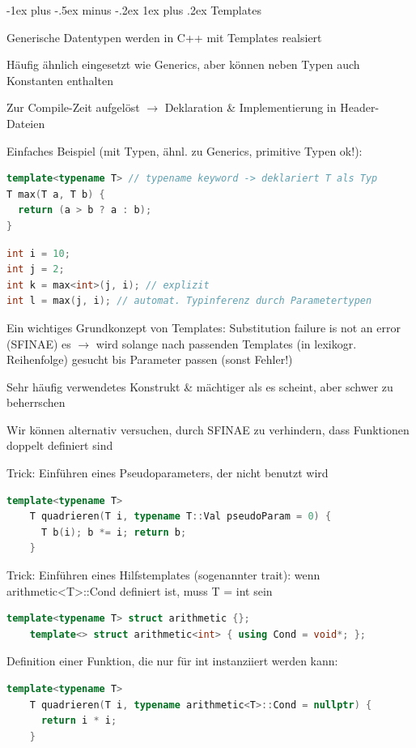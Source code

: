 \documentclass[10pt]{article}
\makeatletter
\renewcommand{\subsubsection}{\@startsection{subsubsection}{3}{0mm}%
                                {-1ex plus -.5ex minus -.2ex}%
                                {1ex plus .2ex}%
                                {\normalfont\small\bfseries}}
\makeatother
\begin{document}
\subsubsection{Templates}
\begin{itemize*}
  \item Generische Datentypen werden in C++ mit Templates realsiert
  \item Häufig ähnlich eingesetzt wie Generics, aber können neben Typen auch Konstanten enthalten
  \item Zur Compile-Zeit aufgelöst $\rightarrow$ Deklaration \& Implementierung in Header-Dateien
  \item Einfaches Beispiel (mit Typen, ähnl. zu Generics, primitive Typen ok!):
\end{itemize*}

\begin{lstlisting}[language=C++]
template<typename T> // typename keyword -> deklariert T als Typ
T max(T a, T b) {
  return (a > b ? a : b);
}
\end{lstlisting}

\begin{lstlisting}[language=C++]
int i = 10;
int j = 2;
int k = max<int>(j, i); // explizit
int l = max(j, i); // automat. Typinferenz durch Parametertypen
\end{lstlisting}

\begin{itemize*}
  \item Ein wichtiges Grundkonzept von Templates: Substitution failure is not an error (SFINAE) es $\rightarrow$ wird solange nach passenden Templates (in lexikogr. Reihenfolge) gesucht bis Parameter passen (sonst Fehler!)
  \item Sehr häufig verwendetes Konstrukt \& mächtiger als es scheint, aber schwer zu beherrschen
  \begin{itemize*}
    \item Wir können alternativ versuchen, durch SFINAE zu verhindern, dass Funktionen doppelt definiert sind
    \item Trick: Einführen eines Pseudoparameters, der nicht benutzt wird
    \begin{lstlisting}[language=C++]
    template<typename T>
    T quadrieren(T i, typename T::Val pseudoParam = 0) {
      T b(i); b *= i; return b;
    }
    \end{lstlisting}
    \item Trick: Einführen eines Hilfstemplates (sogenannter trait): wenn arithmetic<T>::Cond definiert ist, muss T = int sein
    \begin{lstlisting}[language=C++]
    template<typename T> struct arithmetic {};
    template<> struct arithmetic<int> { using Cond = void*; };
    \end{lstlisting}
    \item Definition einer Funktion, die nur für int instanziiert werden kann:
    \begin{lstlisting}[language=C++]
    template<typename T>
    T quadrieren(T i, typename arithmetic<T>::Cond = nullptr) {
      return i * i;
    }
    \end{lstlisting}
  \end{itemize*}
\end{itemize*}
\end{document}

